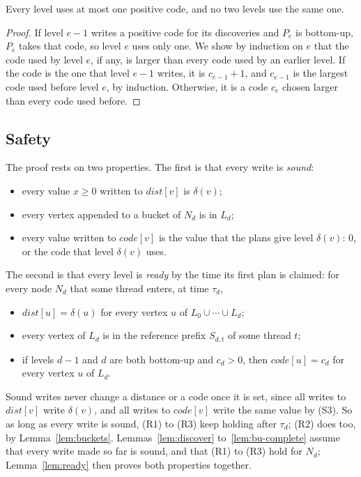 \begin{lemma}[Codes]
\label{lem:codes}
Every level uses at most one positive code, and no two levels use the same one.
\end{lemma}
\begin{proof}
If level $e-1$ writes a positive code for its discoveries and $P_e$ is bottom-up, $P_e$ takes that code, so level $e$ uses only one. We show by induction on $e$ that the code used by level $e$, if any, is larger than every code used by an earlier level. If the code is the one that level $e-1$ writes, it is $c_{e-1} + 1$, and $c_{e-1}$ is the largest code used before level $e$, by induction. Otherwise, it is a code $c_e$ chosen larger than every code used before.
\end{proof}

\subsection{Safety}
\label{sec:pf-safety}

The proof rests on two properties. The first is that every write is \emph{sound}:
\begin{itemize}
    \item[(S1)] every value $x \geq 0$ written to $\mathit{dist}[v]$ is $\delta(v)$;
    \item[(S2)] every vertex appended to a bucket of $N_d$ is in $L_d$;
    \item[(S3)] every value written to $\mathit{code}[v]$ is the value that the plans give level $\delta(v)$: 0, or the code that level $\delta(v)$ uses.
\end{itemize}
The second is that every level is \emph{ready} by the time its first plan is claimed: for every node $N_d$ that some thread enters, at time $\tau_d$,
\begin{itemize}
    \item[(R1)] $\mathit{dist}[u] = \delta(u)$ for every vertex $u$ of $L_0 \cup \cdots \cup L_d$;
    \item[(R2)] every vertex of $L_d$ is in the reference prefix $S_{d,t}$ of some thread $t$;
    \item[(R3)] if levels $d-1$ and $d$ are both bottom-up and $c_d > 0$, then $\mathit{code}[u] = c_d$ for every vertex $u$ of $L_d$.
\end{itemize}
Sound writes never change a distance or a code once it is set, since all writes to $\mathit{dist}[v]$ write $\delta(v)$, and all writes to $\mathit{code}[v]$ write the same value by (S3). So as long as every write is sound, (R1) to (R3) keep holding after $\tau_d$; (R2) does too, by Lemma~\ref{lem:buckets}. Lemmas~\ref{lem:discover} to~\ref{lem:bu-complete} assume that every write made so far is sound, and that (R1) to (R3) hold for $N_d$; Lemma~\ref{lem:ready} then proves both properties together.


